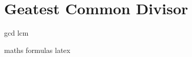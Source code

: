 \chapter{Geatest Common Divisor}

\acrlong{gcd}
\acrfull{lcm}

\Gls{maths}
\Glspl{formula}
\Gls{latex}
